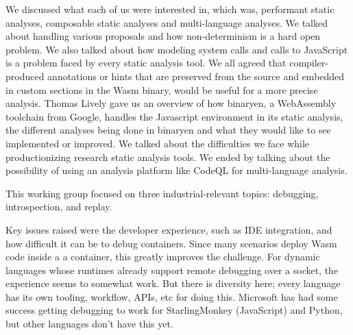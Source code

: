 \documentclass[a4paper,UKenglish]{dagrep-v2018}
\begin{document}
\license

We discussed what each of us were interested in, which was, performant static analyses, composable static analyses and multi-language analyses. We talked about handling various proposals and how non-determinism is a hard open problem. We also talked about how modeling system calls and calls to JavaScript is a problem faced by every static analysis tool. We all agreed that compiler-produced annotations or hints that are preserved from the source and embedded in custom sections in the Wasm binary, would be useful for a more precise analysis. Thomas Lively gave us an overview of how binaryen, a WebAssembly toolchain from Google, handles the Javascript environment in its static analysis, the different analyses being done in binaryen and what they would like to see implemented or improved. We talked about the difficulties we face while  productionizing research static analysis tools. We ended by talking about the possibility of using an analysis platform like CodeQL for multi-language analysis.

\license

This working group focused on three industrial-relevant topics: debugging, introspection, and replay.

Key issues raised were the developer experience, such as IDE integration, and how difficult it can be to debug containers. Since many scenarios deploy Wasm code inside a a container, this greatly improves the challenge. For dynamic languages whose runtimes already support remote debugging over a socket, the experience seems to somewhat work. But there is diversity here; every language has its own tooling, workflow, APIs, etc for doing this. Microsoft has had some success getting debugging to work for StarlingMonkey (JavaScript) and Python, but other languages don't have this yet.
\end{document}
